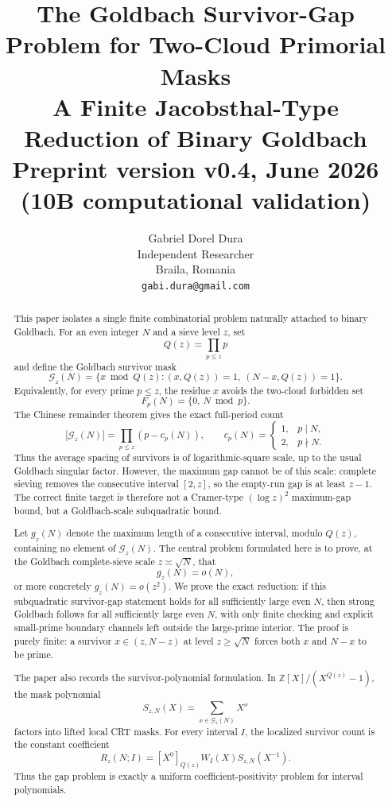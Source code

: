 \documentclass[11pt]{article}
\title{The Goldbach Survivor-Gap Problem for Two-Cloud Primorial Masks\\
\large A Finite Jacobsthal-Type Reduction of Binary Goldbach\\[0.3em]
\normalsize Preprint version v0.4, June 2026 (10B computational validation)}
\author{Gabriel Dorel Dura\\Independent Researcher\\Braila, Romania\\\texttt{gabi.dura@gmail.com}}
\date{}
\theoremstyle{plain}
\theoremstyle{definition}
\theoremstyle{remark}
\newcommand{\Z}{\mathbb Z}
\newcommand{\G}{\mathcal G}
\begin{document}
\maketitle

\begin{abstract}
This paper isolates a single finite combinatorial problem naturally attached to
binary Goldbach.  For an even integer \(N\) and a sieve level \(z\), set
\[
Q(z)=\prod_{p\le z}p
\]
and define the Goldbach survivor mask
\[
\G_z(N)=\{x\bmod Q(z):(x,Q(z))=1,\ (N-x,Q(z))=1\}.
\]
Equivalently, for every prime \(p\le z\), the residue \(x\) avoids the two-cloud
forbidden set
\[
F_p(N)=\{0,\,N\bmod p\}.
\]
The Chinese remainder theorem gives the exact full-period count
\[
|\G_z(N)|=\prod_{p\le z}(p-c_p(N)),\qquad
c_p(N)=\begin{cases}1,&p\mid N,\\2,&p\nmid N.\end{cases}
\]
Thus the average spacing of survivors is of logarithmic-square scale, up to the
usual Goldbach singular factor.  However, the maximum gap cannot be of this
scale: complete sieving removes the consecutive interval \([2,z]\), so the
empty-run gap is at least \(z-1\).  The correct finite target is therefore not a
Cramer-type \((\log z)^2\) maximum-gap bound, but a Goldbach-scale subquadratic
bound.

Let \(g_z(N)\) denote the maximum length of a consecutive interval, modulo
\(Q(z)\), containing no element of \(\G_z(N)\).  The central problem formulated
here is to prove, at the Goldbach complete-sieve scale \(z\asymp \sqrt N\), that
\[
g_z(N)=o(N),
\]
or more concretely \(g_z(N)=o(z^2)\).  We prove the exact reduction: if this
subquadratic survivor-gap statement holds for all sufficiently large even
\(N\), then strong Goldbach follows for all sufficiently large even \(N\), with
only finite checking and explicit small-prime boundary channels left outside the
large-prime interior.  The proof is purely finite: a survivor
\(x\in(z,N-z)\) at level \(z\ge\sqrt N\) forces both \(x\) and \(N-x\) to be
prime.

The paper also records the survivor-polynomial formulation.  In
\(\Z[X]/(X^{Q(z)}-1)\), the mask polynomial
\[
S_{z,N}(X)=\sum_{x\in\G_z(N)}X^x
\]
factors into lifted local CRT masks.  For every interval \(I\), the localized
survivor count is the constant coefficient
\[
R_z(N;I)=[X^0]_{Q(z)}W_I(X)S_{z,N}(X^{-1}).
\]
Thus the gap problem is exactly a uniform coefficient-positivity problem for
interval polynomials.


\end{abstract}
\end{document}
